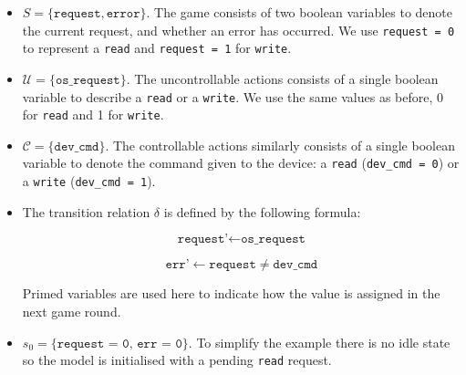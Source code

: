 \begin{itemize}
    \item $S = \{ \texttt{request}, \texttt{error} \} $. The game consists of two boolean variables to denote the current request, and whether an error has occurred. We use \texttt{request = 0} to represent a \texttt{read} and \texttt{request = 1} for \texttt{write}.
    \item $\mathcal{U} = \{ \texttt{os\_request} \} $. The uncontrollable actions consists of a single boolean variable to describe a \texttt{read} or a \texttt{write}. We use the same values as before, 0 for \texttt{read} and 1 for \texttt{write}.
    \item $\mathcal{C} = \{ \texttt{dev\_cmd} \}$. The controllable actions similarly consists of a single boolean variable to denote the command given to the device: a \texttt{read} (\texttt{dev\_cmd = 0}) or a \texttt{write} (\texttt{dev\_cmd = 1}).
    \item The transition relation $\delta$ is defined by the following formula:

        $$ \texttt{request'} \gets \texttt{os\_request} $$

        $$ \texttt{err'} \gets \texttt{request} \neq \texttt{dev\_cmd} $$

        Primed variables are used here to indicate how the value is assigned in the next game round.

    \item $s_0 = \{ \texttt{request = 0, err = 0} \}$. To simplify the example there is no idle state so the model is initialised with a pending \texttt{read} request.

\end{itemize}


